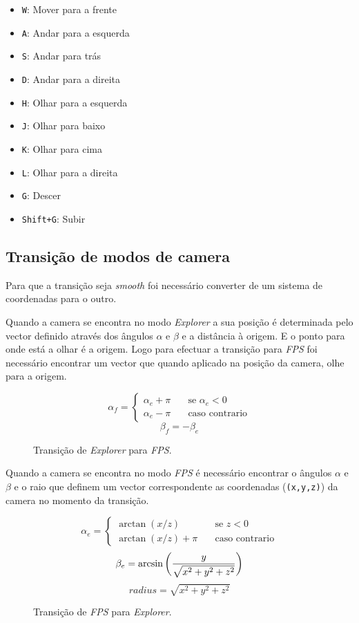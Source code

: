 \documentclass[a4paper]{article}
\begin{document}
\begin{itemize}
    \item \texttt{W}: Mover para a frente
    \item \texttt{A}: Andar para a esquerda
    \item \texttt{S}: Andar para trás
    \item \texttt{D}: Andar para a direita
    \item \texttt{H}: Olhar para a esquerda
    \item \texttt{J}: Olhar para baixo
    \item \texttt{K}: Olhar para cima
    \item \texttt{L}: Olhar para a direita
    \item \texttt{G}: Descer
    \item \texttt{Shift+G}: Subir
\end{itemize}

\subsection{Transição de modos de camera}

Para que a transição seja \textit{smooth} foi necessário converter de um sistema de coordenadas para o outro.

Quando a camera se encontra no modo \textit{Explorer} a sua posição é determinada pelo vector definido através dos ângulos $\alpha$ e $\beta$ e a distância à origem. E o ponto para onde está a olhar é a origem. Logo para efectuar a transição para \textit{FPS} foi necessário encontrar um vector que quando aplicado na posição da camera, olhe para a origem.

\begin{figure}[H]
    \[
        \alpha_f =
        \begin{cases}
            \alpha_e + \pi & \quad \text{se } \alpha_e < 0\\
            \alpha_e - \pi & \quad \text{caso contrario}
        \end{cases}
    \]
    \[
        \beta_f = -\beta_e
    \]
    \caption{Transição de \textit{Explorer} para \textit{FPS}.}
\end{figure}

Quando a camera se encontra no modo \textit{FPS} é necessário encontrar o ângulos $\alpha$ e $\beta$ e o raio que definem um vector correspondente as coordenadas (\texttt{(x,y,z)}) da camera no momento da transição.

\begin{figure}[H]
    \[
        \alpha_e =
        \begin{cases}
            \arctan(x / z)       & \quad \text{se } z < 0\\
            \arctan(x / z) + \pi & \quad \text{caso contrario}
        \end{cases}
    \]
    \[
        \beta_e = \arcsin\bigg(\frac{y}{\sqrt{x^2 + y^2 + z^2}}\bigg)\\
    \]
    \[
        radius = \sqrt{x^2 + y^2 + z^2}
    \]
    \caption{Transição de \textit{FPS} para \textit{Explorer}.}
\end{figure}
\end{document}
